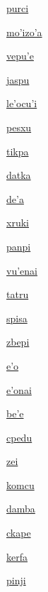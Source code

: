 {\hyperlink{val:purci}{purci}}{}{}{}

{\hyperlink{val:mohizoha}{mo'izo'a}}{}{}{}

{\hyperlink{val:vepuhe}{vepu'e}}{}{}{}

{\hyperlink{val:jaspu}{jaspu}}{}{}{}

{\hyperlink{val:lehocuhi}{le'ocu'i}}{}{}{}

{\hyperlink{val:pesxu}{pesxu}}{}{}{}

{\hyperlink{val:tikpa}{tikpa}}{}{}{}

{\hyperlink{val:datka}{datka}}{}{}{}

{\hyperlink{val:deha}{de'a}}{}{}{}

{\hyperlink{val:xruki}{xruki}}{}{}{}

{\hyperlink{val:panpi}{panpi}}{}{}{}

{\hyperlink{val:vuhenai}{vu'enai}}{}{}{}

{\hyperlink{val:tatru}{tatru}}{}{}{}

{\hyperlink{val:spisa}{spisa}}{}{}{}

{\hyperlink{val:zbepi}{zbepi}}{}{}{}

{\hyperlink{val:eho}{e'o}}{}{}{}

{\hyperlink{val:ehonai}{e'onai}}{}{}{}

{\hyperlink{val:behe}{be'e}}{}{}{}

{\hyperlink{val:cpedu}{cpedu}}{}{}{}

{\hyperlink{val:zei}{zei}}{}{}{}

{\hyperlink{val:komcu}{komcu}}{}{}{}

{\hyperlink{val:damba}{damba}}{}{}{}

{\hyperlink{val:ckape}{ckape}}{}{}{}

{\hyperlink{val:kerfa}{kerfa}}{}{}{}

{\hyperlink{val:pinji}{pinji}}{}{}{}

